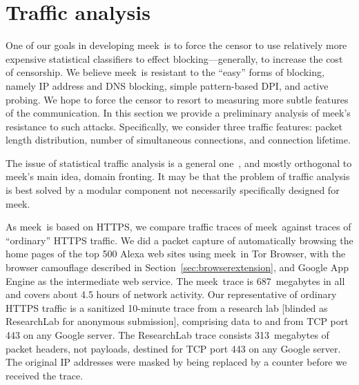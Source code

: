 \documentclass[conference]{IEEEtran}
\newcommand{\meek}{meek\xspace}
\newcommand{\lbl}{ResearchLab\xspace}
\begin{document}
\section{Traffic analysis}
\label{sec:trafficanalysis}

One of our goals in developing \meek\ is to force
the censor to use relatively more expensive statistical classifiers
to effect blocking---generally, to increase the cost of censorship.
We believe \meek\ is resistant to the ``easy''
forms of blocking, namely IP address and DNS blocking,
simple pattern-based DPI,
and active probing.
We hope to force the censor to resort to measuring
more subtle features of the communication.
In this section we provide a preliminary analysis
of \meek's resistance to such attacks.
Specifically, we consider three traffic features:
packet length distribution,
number of simultaneous connections,
and connection lifetime.

The issue of statistical traffic analysis is a general one~\cite{trafficmorphing},
and mostly orthogonal to \meek's main idea, domain fronting.
It may be that the problem of traffic analysis is
best solved by a modular component not
necessarily specifically designed for \meek.

As \meek\ is based on HTTPS,
we compare traffic traces of \meek\ against
traces of ``ordinary'' HTTPS traffic.
We did a packet capture
of automatically browsing the home pages
of the top 500 Alexa web sites using \meek\ in Tor Browser,
with the browser camouflage described in Section~\ref{sec:browserextension},
and Google App Engine as the intermediate web service.
The \meek\ trace is 687~megabytes in all
and covers about 4.5 hours of network activity.
Our representative of ordinary HTTPS traffic
is a sanitized 10-minute trace
from 
a research lab [blinded as \lbl for anonymous submission],
comprising data to and from TCP port 443 on any Google server.
The \lbl trace consists 313~megabytes of packet headers,
not payloads, destined for TCP port 443 on any Google server.
The original IP addresses were masked by being
replaced by a counter before we received the trace.
\end{document}
